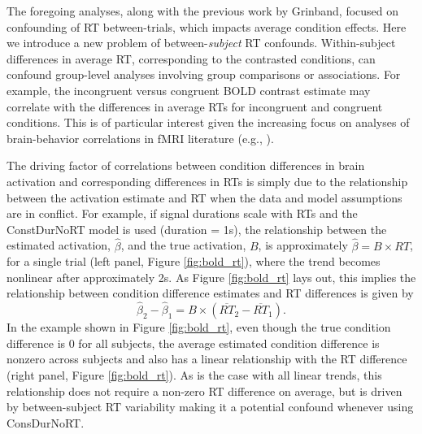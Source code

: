 \documentclass[sn-mathphys,Numbered, super, referee, lineno]{sn-jnl}
\begin{document}
The foregoing analyses, along with the previous work by Grinband, focused on confounding of RT between-trials, which impacts average condition effects.  Here we introduce a new problem of between-\emph{subject} RT confounds.  Within-subject differences in average RT, corresponding to the contrasted conditions, can confound group-level analyses involving group comparisons or associations.  For example, the incongruent versus congruent BOLD contrast estimate may correlate with the differences in average RTs for incongruent and congruent conditions.  This is of particular interest given the increasing focus on analyses of brain-behavior correlations in fMRI literature (e.g., \citet{duboisBuildingScienceIndividual2016}).

The driving factor of correlations between condition differences in brain activation and corresponding differences in RTs is simply due to the relationship between the activation estimate and RT when the data and model assumptions are in conflict. For example, if signal durations scale with RTs and the ConstDurNoRT model is used (duration = 1s), the relationship between the estimated activation, $\hat\beta$, and the true activation, $B$, is approximately $\hat\beta = B \times RT$, for a single trial (left panel, Figure \ref{fig:bold_rt}), where the trend becomes nonlinear after approximately 2s.  As Figure \ref{fig:bold_rt} lays out, this implies the relationship between condition difference estimates and RT differences is given by
\begin{equation}\label{eq:linear}
\hat\beta_2 -\hat\beta_1 = B\times\left(\overline{RT}_2 - \overline{RT}_1\right).
\end{equation}
In the example shown in  Figure \ref{fig:bold_rt}, even though the true condition difference is 0 for all subjects, the average estimated condition difference is nonzero across subjects and also has a linear relationship with the RT difference (right panel, Figure \ref{fig:bold_rt}). As is the case with all linear trends, this relationship does not require a non-zero RT difference on average, but is driven by between-subject RT variability making it a potential confound whenever using ConsDurNoRT.
\end{document}
